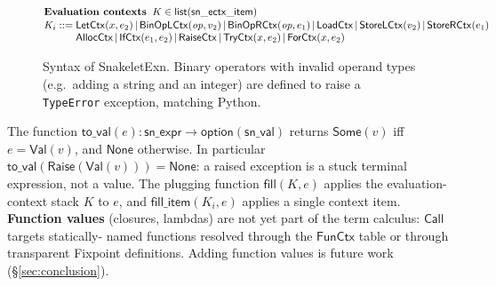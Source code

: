 \documentclass[11pt,a4paper]{article}
\begin{document}
\begin{figure}[t]
{{\begin{minipage}{\linewidth}
\[\begin{array}{@{}l@{}}
\textbf{Evaluation contexts} \;\; K \in \mathsf{list}(\mathsf{sn\_ectx\_item}) \\[1pt]
\begin{array}{@{}r@{\;}c@{\;}l@{}}
K_i &::=& \mathsf{LetCtx}(x, e_2) \,|\, \mathsf{BinOpLCtx}(\mathit{op}, v_2) \,|\, \mathsf{BinOpRCtx}(\mathit{op}, e_1)
       \,|\, \mathsf{LoadCtx}
       \,|\, \mathsf{StoreLCtx}(v_2) \,|\, \mathsf{StoreRCtx}(e_1) \\
  & & \mathsf{AllocCtx} \,|\, \mathsf{IfCtx}(e_1, e_2)
       \,|\, \mathsf{RaiseCtx}
       \,|\, \mathsf{TryCtx}(x, e_2)
       \,|\, \mathsf{ForCtx}(x, e_2)
\end{array}
\end{array}
\]
\end{minipage}}}
\caption{Syntax of SnakeletExn.  Binary operators with invalid
  operand types (e.g.\ adding a string and an integer) are defined
  to raise a \texttt{TypeError} exception, matching Python.}
\label{fig:snakelet-syntax}
\end{figure}

The function $\mathsf{to\_val}(e) : \mathsf{sn\_expr} \to
\mathsf{option}(\mathsf{sn\_val})$ returns $\mathsf{Some}(v)$ iff $e =
\mathsf{Val}(v)$, and $\mathsf{None}$ otherwise.  In particular
$\mathsf{to\_val}(\mathsf{Raise}(\mathsf{Val}(v))) = \mathsf{None}$:
a raised exception is a stuck terminal expression, not a value.  The
plugging function $\mathsf{fill}(K, e)$ applies the evaluation-context
stack $K$ to $e$, and $\mathsf{fill\_item}(K_i, e)$ applies a single
context item.  \textbf{Function values} (closures, lambdas) are not
yet part of the term calculus: $\mathsf{Call}$ targets statically-
named functions resolved through the $\mathsf{FunCtx}$ table or
through transparent Fixpoint definitions.  Adding function values is
future work (\S\ref{sec:conclusion}).
\end{document}
